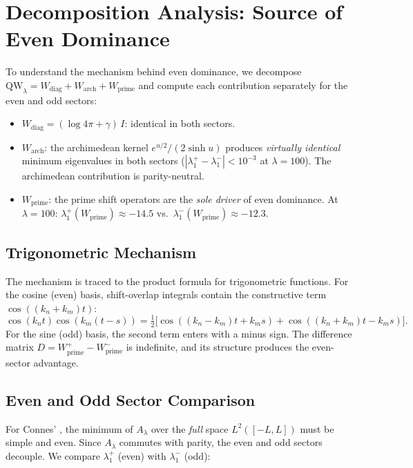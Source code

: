 \documentclass[12pt,a4paper]{article}
\theoremstyle{definition}
\theoremstyle{remark}
\begin{document}
\section{Decomposition Analysis: Source of Even Dominance}
\label{sec:decomposition}

To understand the mechanism behind even dominance, we decompose $\mathrm{QW}_\lambda = W_{\mathrm{diag}} + W_{\mathrm{arch}} + W_{\mathrm{prime}}$ and compute each contribution separately for the even and odd sectors:

\begin{itemize}
  \item $W_{\mathrm{diag}} = (\log 4\pi + \gamma)\,I$: identical in both sectors.
  \item $W_{\mathrm{arch}}$: the archimedean kernel $e^{u/2}/(2\sinh u)$ produces \emph{virtually identical} minimum eigenvalues in both sectors ($|\lambda_1^+ - \lambda_1^-| < 10^{-3}$ at $\lambda = 100$). The archimedean contribution is parity-neutral.
  \item $W_{\mathrm{prime}}$: the prime shift operators are the \emph{sole driver} of even dominance. At $\lambda = 100$: $\lambda_1^+(W_{\mathrm{prime}}) \approx -14.5$ vs.\ $\lambda_1^-(W_{\mathrm{prime}}) \approx -12.3$.
\end{itemize}

\subsection{Trigonometric Mechanism}

The mechanism is traced to the product formula for trigonometric functions. For the cosine (even) basis, shift-overlap integrals contain the constructive term $\cos((k_n + k_m)t)$:
\[
  \cos(k_n t)\cos(k_m(t-s)) = \tfrac{1}{2}\bigl[\cos((k_n-k_m)t + k_m s) + \cos((k_n+k_m)t - k_m s)\bigr].
\]
For the sine (odd) basis, the second term enters with a minus sign. The difference matrix $D = W_{\mathrm{prime}}^+ - W_{\mathrm{prime}}^-$ is indefinite, and its structure produces the even-sector advantage.

\subsection{Even and Odd Sector Comparison}

For Connes' , the minimum of $A_\lambda$ over the \emph{full} space $L^2([-L,L])$ must be simple and even. Since $A_\lambda$ commutes with parity, the even and odd sectors decouple. We compare $\lambda_1^+$ (even) with $\lambda_1^-$ (odd):
\end{document}
